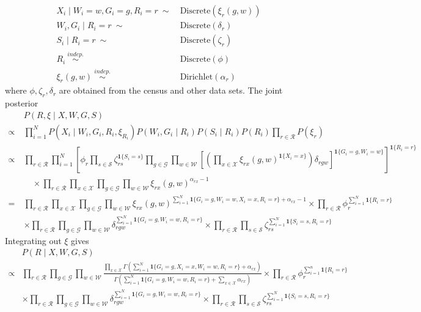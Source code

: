 \documentclass[11pt]{article}
\theoremstyle{plain}
\newcommand{\indep}{\stackrel{indep.}{\sim}}
\newcommand{\Dir}{\text{Dirichlet}}
\newcommand{\cW}{\mathcal{W}}
\newcommand{\cS}{\mathcal{S}}
\newcommand{\cR}{\mathcal{R}}
\newcommand{\cG}{\mathcal{G}}
\newcommand{\cX}{\mathcal{X}}
\begin{document}
\begin{align}
  X_i \mid W_i =w, G_i = g,  R_i = r \ \sim & \ \text{Discrete}(\xi_r(g,w))  \\
  W_i, G_i \mid R_i  = r \ \sim & \ \text{Discrete}(\delta_r) \\
  S_i \mid R_i = r \ \sim & \ \text{Discrete}(\zeta_r)  \\
  R_i \ \indep & \ \text{Discrete}(\phi) \\
  \xi_r(g,w) \ \indep  & \ \Dir(\alpha_r)
\end{align}
where $\phi, \zeta_r, \delta_r$ are obtained from the census and other
data sets.  The joint posterior
\begin{align}
  & P(R, \xi \mid X, W, G, S) \\
  \propto \ & \prod_{i=1}^N P(X_i \mid W_i, G_i,
  R_i, \xi_{R_i})P(W_i, G_i \mid R_i) P(S_i \mid R_i) P(R_i) \prod_{r
              \in \cR} P(\xi_r) \\
  \propto \ & \prod_{r \in \cR} \prod_{i=1}^N  \left[\phi_r \prod_{s \in \cS}
              \zeta_{rs}^{\mathbf{1}\{S_i = s\}} \prod_{g \in \cG} \prod_{w \in \cW}
             \left[ \left(\prod_{x \in \cX} \xi_{rx}(g,w)^{\mathbf{1}\{X_i = x\}}\right)
              \delta_{rgw}\right]^{\mathbf{1}\{G_i = g, W_i =
              w\}} \right]^{\mathbf{1}\{R_i = r\}} \\
  & \quad \times \prod_{r \in \cR} \prod_{x \in \cX} \prod_{g \in \cG}
    \prod_{w \in \cW}\xi_{rx}(g,w)^{\alpha_{rx}-1} \\
  = \ &  \prod_{r \in \cR} \prod_{x \in \cX} \prod_{g \in \cG}
    \prod_{w \in \cW}\xi_{rx}(g,w)^{\sum_{i=1}^N \mathbf{1}\{G_i = g,
        W_i = w, X_i = x, R_i = r\} + \alpha_{rx}-1} \times \prod_{r
        \in \cR} \phi_r^{\sum_{i=1}^N \mathbf{1}\{R_i = r\}} \\
  & \times \prod_{r \in \cR} \prod_{g \in \cG}
    \prod_{w \in \cW}\delta_{rgw}^{\sum_{i=1}^N \mathbf{1}\{G_i = g,
        W_i = w, R_i = r\}} \times \prod_{r  \in \cR} \prod_{s \in \cS}
    \zeta_{rs}^{\sum_{i=1}^N \mathbf{1}\{S_i = s, R_i = r\}}
\end{align}
Integrating out $\xi$ gives
\begin{align}
  &  P(R \mid X, W, G, S) \\
\propto  & \prod_{r \in \cR} \prod_{g \in \cG}
    \prod_{w \in \cW} \frac{\prod_{x \in \cX}\Gamma(\sum_{i=1}^N \mathbf{1}\{G_i =
           g, X_i = x,  W_i = w, R_i = r\} + \alpha_{rx})}{\Gamma(\sum_{i=1}^N
           \mathbf{1}\{G_i = g,
           W_i = w, R_i = r\} + \sum_{x\in\cX} \alpha_{rx})} \times \prod_{r
        \in \cR} \phi_r^{\sum_{i=1}^n \mathbf{1}\{R_i = r\}} \\
  & \times \prod_{r \in \cR} \prod_{g \in \cG}
    \prod_{w \in \cW}\delta_{rgw}^{\sum_{i=1}^N \mathbf{1}\{G_i = g,
        W_i = w, R_i = r\}} \times \prod_{r  \in \cR} \prod_{s \in \cS}
    \zeta_{rs}^{\sum_{i=1}^N \mathbf{1}\{S_i = s, R_i = r\}}
\end{align}
\end{document}
